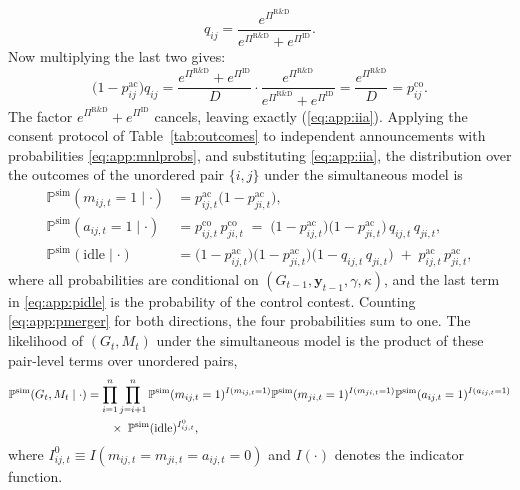 \[
q_{ij} = \frac{e^{\Pi^{\text{R\&D}}}}{e^{\Pi^{\text{R\&D}}} + e^{\Pi^{\text{ID}}}}.
\]
Now multiplying the last two gives:
\[
\bigl(1 - p^{\text{ac}}_{ij}\bigr) q_{ij} = \frac{e^{\Pi^{\text{R\&D}}} + e^{\Pi^{\text{ID}}}}{D} \cdot \frac{e^{\Pi^{\text{R\&D}}}}{e^{\Pi^{\text{R\&D}}} + e^{\Pi^{\text{ID}}}} = \frac{e^{\Pi^{\text{R\&D}}}}{D} = p^{\text{co}}_{ij}.
\]
The factor $e^{\Pi^{\text{R\&D}}} + e^{\Pi^{\text{ID}}}$ cancels, leaving exactly (\ref{eq:app:iia}). Applying the consent protocol of Table~\ref{tab:outcomes} to
independent announcements with probabilities \eqref{eq:app:mnlprobs},
and substituting \eqref{eq:app:iia}, the distribution over the outcomes
of the unordered pair $\{i,j\}$ under the simultaneous model is
\begin{align}
  \mathbb{P}^{\mathrm{sim}}(m_{ij,t} = 1\mid \cdot)
  &= p^{\mathrm{ac}}_{ij,t} \bigl( 1 - p^{\mathrm{ac}}_{ji,t} \bigr),
  \label{eq:app:pmerger} \\[2pt]
  \mathbb{P}^{\mathrm{sim}}(a_{ij,t} = 1\mid \cdot)
  &= p^{\mathrm{co}}_{ij,t}\, p^{\mathrm{co}}_{ji,t}
   \;=\; \bigl( 1 - p^{\mathrm{ac}}_{ij,t} \bigr)
     \bigl( 1 - p^{\mathrm{ac}}_{ji,t} \bigr)\,
     q_{ij,t}\, q_{ji,t},
  \label{eq:app:pcollab} \\[2pt]
  \mathbb{P}^{\mathrm{sim}}(\text{idle}\mid \cdot)
  &= \bigl( 1 - p^{\mathrm{ac}}_{ij,t} \bigr)
     \bigl( 1 - p^{\mathrm{ac}}_{ji,t} \bigr)
     \bigl( 1 - q_{ij,t}\, q_{ji,t} \bigr)
     \;+\; p^{\mathrm{ac}}_{ij,t}\, p^{\mathrm{ac}}_{ji,t},
  \label{eq:app:pidle}
\end{align}
where all probabilities are conditional on $(G_{t-1},
\mathbf{y}_{t-1}, \gamma, \kappa)$, and the last term in
\eqref{eq:app:pidle} is the probability of the control contest. Counting
\eqref{eq:app:pmerger} for both directions, the four probabilities sum
to one. The likelihood of $(G_t, M_t)$ under the simultaneous model is
the product of these pair-level terms over unordered pairs,
\begin{align}
  \mathbb{P}^{\mathrm{sim}}(G_t, M_t \mid \cdot)
  & =
  \prod_{i=1}^{n} \prod_{j=i+1}^{n}
  \mathbb{P}^{\mathrm{sim}}(m_{ij,t}=1)^{I(m_{ij,t}=1)}
  \mathbb{P}^{\mathrm{sim}}(m_{ji,t}=1)^{I(m_{ji,t}=1)}
  \mathbb{P}^{\mathrm{sim}}(a_{ij,t}=1)^{I(a_{ij,t}=1)} \notag \\
  & \qquad \times\;
  \mathbb{P}^{\mathrm{sim}}(\text{idle})^{I_{ij,t}^{0}},
  \label{eq:app:liksim}
\end{align}
where $I_{ij,t}^{0} \equiv I(m_{ij,t} = m_{ji,t} = a_{ij,t} = 0)$ and $I(\cdot)$ denotes the indicator function.
